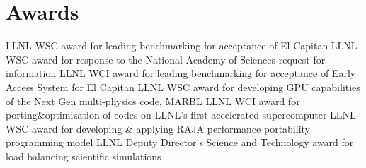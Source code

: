 \section{Awards}

	{LLNL WSC award for leading benchmarking for acceptance of El Capitan}
	{LLNL WSC award for response to the National Academy of Sciences request for information}%
	{LLNL WCI award for leading benchmarking for acceptance of Early Access System for El Capitan}
	{LLNL WSC award for developing GPU capabilities of the Next Gen multi-physics code, MARBL}
	{LLNL WCI award for porting\&optimization of codes on LLNL's first accelerated supercomputer}%
	{LLNL WSC award for developing \& applying RAJA performance portability programming model}
       	{LLNL Deputy Director's Science and Technology award for load balancing scientific simulations}
